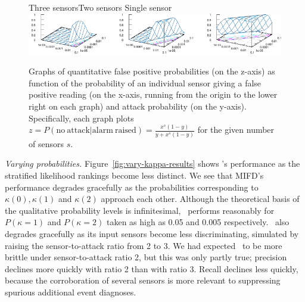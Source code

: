 \begin{figure}
  \centering
  \textsf{Three sensors}\hspace{40mm}\textsf{Two sensors}
  \hspace{38mm}\textsf{Single sensor} 
  \\
  \includegraphics[width=\textwidth]{figures/consolidated-base-rate-cropped.pdf}
  \caption[Base rate problems and sensor fusion.]
    {Graphs of quantitative false positive probabilities (on the
      z-axis) as function of the probability of an individual sensor
      giving a false positive reading (on the x-axis, running from the
      origin to the lower right on each graph) and attack probability
      (on the y-axis).  Specifically, each graph plots
      $z=P(\mathrm{no~attack}|\mathrm{alarm~raised})=\frac{x^s(1-y)}{y+x^s(1-y)}$
      for the given number of sensors $s$. }
  \label{fig:base-rate-plots}
\end{figure}


\emph{Varying probabilities.}
Figure~\ref{fig:vary-kappa-results} shows \mifd's performance as the
stratified likelihood rankings become less distinct.
We see that MIFD's performance degrades gracefully as the probabilities
corresponding to $\kappa(0), \kappa(1)$ and $\kappa(2)$ approach each other.
Although the
theoretical basis of the qualitative probability levels is
infinitesimal, \mifd\ performs reasonably for $P(\kappa=1)$ and
$P(\kappa=2)$ taken as high as 0.05 and 0.005 respectively.
\mifd\ also degrades gracefully as its input sensors become
less discriminating, simulated by raising the sensor-to-attack ratio
from 2 to 3.  We had expected \mifd\ to be more brittle under
sensor-to-attack ratio 2, but this was only partly true;
precision declines more quickly with ratio 2 than with ratio 3.
Recall declines less quickly, because the corroboration of several
sensors
is more relevant to suppressing spurious additional event diagnoses.


